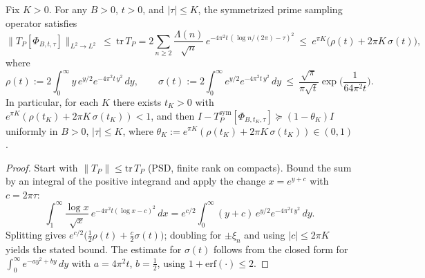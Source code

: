 \begin{lemma}\label{lem:shift-trace-cap}
Fix $K>0$. For any $B>0$, $t>0$, and $|\tau|\le K$, the symmetrized prime sampling operator
satisfies
\begin{equation}\label{eq:Prime_trace_closed_form-formula}
\|T_P[\Phi_{B,t,\tau}]\|_{L^2\to L^2}\ \le\ \mathrm{tr}\,T_P
= 2\sum_{n\ge2}\frac{\Lambda(n)}{\sqrt n}\,e^{-4\pi^2 t\,(\log n/(2\pi)-\tau)^2}
\ \le\ e^{\pi K}\Big(\rho(t)+2\pi K\,\sigma(t)\Big),
\end{equation}
where
\begin{equation}\label{eq:Prime_trace_closed_form-formula-3}
\rho(t):=2\int_0^\infty y\,e^{y/2}e^{-4\pi^2 t\,y^2}\,dy,\qquad
\sigma(t):=2\int_0^\infty e^{y/2}e^{-4\pi^2 t\,y^2}\,dy
\ \le\ \frac{\sqrt{\pi}}{\pi\sqrt{t}}\exp\!\Big(\frac{1}{64\pi^2 t}\Big).
\end{equation}
In particular, for each $K$ there exists $t_K>0$ with $e^{\pi K}(\rho(t_K)+2\pi K\,\sigma(t_K))<1$,
and then $I-T^{\mathrm{sym}}_P[\Phi_{B,t_K,\tau}]\succeq (1-\theta_K)I$ uniformly in $B>0$, $|\tau|\le K$,
where $\theta_K:=e^{\pi K}(\rho(t_K)+2\pi K\,\sigma(t_K))\in(0,1)$.
\end{lemma}
\begin{proof}
Start with $\|T_P\|\le \mathrm{tr}\,T_P$ (PSD, finite rank on compacts).
Bound the sum by an integral of the positive integrand and apply the change $x=e^{y+c}$ with $c=2\pi\tau$:
\begin{equation}\label{eq:Prime_trace_closed_form-formula-2}
\int_1^\infty \frac{\log x}{\sqrt x}\,e^{-4\pi^2 t(\log x-c)^2}\,dx
= e^{c/2}\!\int_0^\infty (y+c)\,e^{y/2}e^{-4\pi^2 t\,y^2}\,dy.
\end{equation}
Splitting gives $e^{c/2}\big(\tfrac12\rho(t)+\tfrac{c}{2}\sigma(t)\big)$; doubling for $\pm\xi_n$ and using $|c|\le 2\pi K$
yields the stated bound. The estimate for $\sigma(t)$ follows from the closed form for $\int_0^\infty e^{-ay^2+by}\,dy$
with $a=4\pi^2 t$, $b=\tfrac12$, using $1+\mathrm{erf}(\cdot)\le 2$.
\end{proof}
